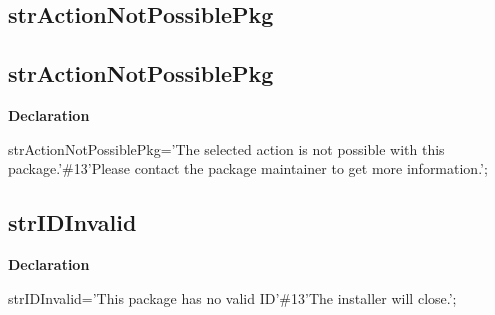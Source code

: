 \documentclass{report}
\newif\ifpdf
\begin{document}
\subsection*{\large{\textbf{strActionNotPossiblePkg}}\normalsize\hspace{1ex}\hrulefill}
\else
\subsection*{strActionNotPossiblePkg}
\fi
\label{trstrings-strActionNotPossiblePkg}
\begin{list}{}{
\setlength{\itemindent}{0cm}
\setlength{\listparindent}{0cm}
\setlength{\leftmargin}{\evensidemargin}
\addtolength{\leftmargin}{\tmplength}
\settowidth{\labelsep}{X}
\addtolength{\leftmargin}{\labelsep}
\setlength{\labelwidth}{\tmplength}
}
\item[\textbf{Declaration}\hfill]
\ifpdf
\begin{flushleft}
\fi
\begin{ttfamily}
strActionNotPossiblePkg='The selected action is not possible with this package.'{\#}13'Please contact the package maintainer to get more information.';\end{ttfamily}

\ifpdf
\end{flushleft}
\fi

\end{list}
\ifpdf
\subsection*{\large{\textbf{strIDInvalid}}\normalsize\hspace{1ex}\hrulefill}
\else
\subsection*{strIDInvalid}
\fi
\label{trstrings-strIDInvalid}
\begin{list}{}{
\setlength{\itemindent}{0cm}
\setlength{\listparindent}{0cm}
\setlength{\leftmargin}{\evensidemargin}
\addtolength{\leftmargin}{\tmplength}
\settowidth{\labelsep}{X}
\addtolength{\leftmargin}{\labelsep}
\setlength{\labelwidth}{\tmplength}
}
\item[\textbf{Declaration}\hfill]
\ifpdf
\begin{flushleft}
\fi
\begin{ttfamily}
strIDInvalid='This package has no valid ID'{\#}13'The installer will close.';\end{ttfamily}

\ifpdf
\end{flushleft}
\fi

\end{list}
\ifpdf
\end{document}
